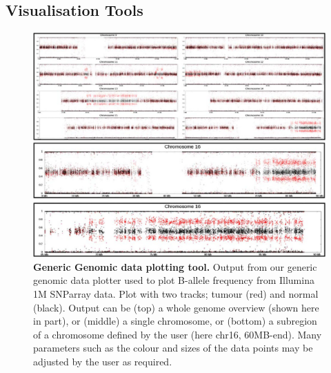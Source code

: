 \subsection*{Visualisation Tools}

\begin{figure}[t!]
\centering
\includegraphics[scale=1.5]{chapters/images/cgtag/fig1-plotter.png}
\caption{\textbf{Generic Genomic data plotting tool.} Output from our generic genomic data plotter used to plot B-allele frequency from Illumina 1M SNParray data. Plot with two tracks; tumour (red) and normal (black). Output can be (top) a whole genome overview (shown here in part), or (middle) a single chromosome, or (bottom) a subregion of a chromosome defined by the user (here chr16, 60MB-end). Many parameters such as the colour and sizes of the data points may be adjusted by the user as required.}
\label{fig:plotter}
\end{figure}


